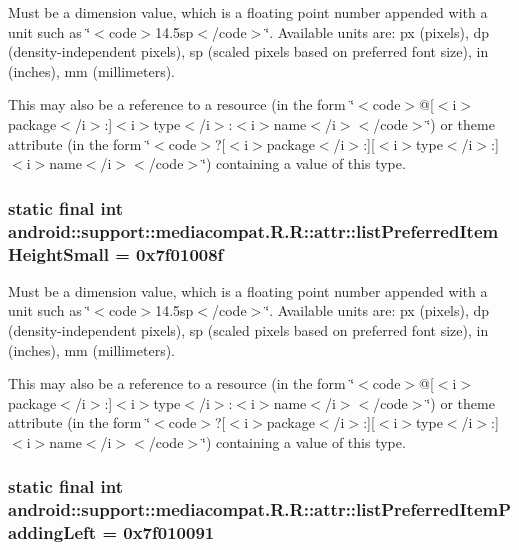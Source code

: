 Must be a dimension value, which is a floating point number appended with a unit such as \char`\"{}$<$code$>$14.5sp$<$/code$>$\char`\"{}. Available units are: px (pixels), dp (density-independent pixels), sp (scaled pixels based on preferred font size), in (inches), mm (millimeters). 

This may also be a reference to a resource (in the form \char`\"{}$<$code$>$@\mbox{[}$<$i$>$package$<$/i$>$:\mbox{]}$<$i$>$type$<$/i$>$:$<$i$>$name$<$/i$>$$<$/code$>$\char`\"{}) or theme attribute (in the form \char`\"{}$<$code$>$?\mbox{[}$<$i$>$package$<$/i$>$:\mbox{]}\mbox{[}$<$i$>$type$<$/i$>$:\mbox{]}$<$i$>$name$<$/i$>$$<$/code$>$\char`\"{}) containing a value of this type. \hypertarget{classandroid_1_1support_1_1mediacompat_1_1_r_1_1attr_767596060df9a101da530b8031a25f57}{
\subsubsection[{listPreferredItemHeightSmall}]{\setlength{\rightskip}{0pt plus 5cm}static final int android::support::mediacompat.R.R::attr::listPreferredItemHeightSmall = 0x7f01008f}}
\label{classandroid_1_1support_1_1mediacompat_1_1_r_1_1attr_767596060df9a101da530b8031a25f57}


Must be a dimension value, which is a floating point number appended with a unit such as \char`\"{}$<$code$>$14.5sp$<$/code$>$\char`\"{}. Available units are: px (pixels), dp (density-independent pixels), sp (scaled pixels based on preferred font size), in (inches), mm (millimeters). 

This may also be a reference to a resource (in the form \char`\"{}$<$code$>$@\mbox{[}$<$i$>$package$<$/i$>$:\mbox{]}$<$i$>$type$<$/i$>$:$<$i$>$name$<$/i$>$$<$/code$>$\char`\"{}) or theme attribute (in the form \char`\"{}$<$code$>$?\mbox{[}$<$i$>$package$<$/i$>$:\mbox{]}\mbox{[}$<$i$>$type$<$/i$>$:\mbox{]}$<$i$>$name$<$/i$>$$<$/code$>$\char`\"{}) containing a value of this type. \hypertarget{classandroid_1_1support_1_1mediacompat_1_1_r_1_1attr_b0f29113ba3afabbb8dcb957b843d4aa}{
\subsubsection[{listPreferredItemPaddingLeft}]{\setlength{\rightskip}{0pt plus 5cm}static final int android::support::mediacompat.R.R::attr::listPreferredItemPaddingLeft = 0x7f010091}}
\label{classandroid_1_1support_1_1mediacompat_1_1_r_1_1attr_b0f29113ba3afabbb8dcb957b843d4aa}


